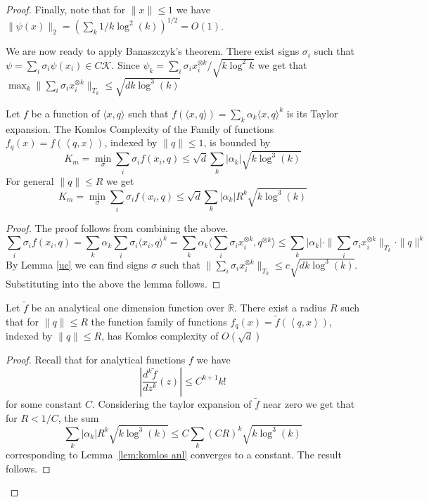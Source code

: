 \documentclass[anon,12pt]{colt2019} %
\newcommand{\ip}[1]{\left \langle #1 \right \rangle}
\newcommand{\R}{\mathbb{R}}
\begin{document}
\begin{proof}
Finally, note that for $\|x\| \le 1$ we have $\|\psi(x)\|_2 = (\sum_k  1/k\log^2(k))^{1/2} = O(1)$.


We are now ready to apply Banaszczyk's theorem. 
There exist signs $\sigma_i$ such that $\psi  = \sum_i \sigma_i \psi(x_i) \in C \mathcal K$.
Since $\psi_k = \sum_i \sigma_i x_i^{\otimes k}/\sqrt{k \log^2{k}}$ we get that $\max_k \|\sum_i \sigma_i  x_i^{\otimes k}\|_{T_k} \le \sqrt{d k \log^{3}(k)}$


\begin{lemma} \label{lem:komlos anl}
Let $f$ be a function of $\langle x,q\rangle$ such that $f(\langle x,q\rangle) = \sum_k \alpha_k \langle x,q\rangle^k$ is its Taylor expansion. The Komlos Complexity of the Family of functions $f_q(x) = f(\ip{q,x})$, indexed by $\|q\| \leq 1$, is bounded by
\[
K_m = \min_\sigma \sum_i \sigma_i f(x_i,q) \le \sqrt{d} \sum_k  |\alpha_k|\sqrt{k\log^3(k)}
\]
For general $\|q\| \leq R$ we get
\[
K_m = \min_\sigma \sum_i \sigma_i f(x_i,q) \le \sqrt{d} \sum_k  |\alpha_k| R^k \sqrt{ k\log^3(k)}
\]
\end{lemma}
\begin{proof}
The proof follows from combining the above.
$$
\sum_i \sigma_i f(x_i,q) = \sum_k \alpha_k \sum_i \sigma_i \langle x_i,q\rangle^k =  \sum_k \alpha_k  \langle  \sum_i \sigma_i x_i^{\otimes k},q^{\otimes k}\rangle \le \sum_k |\alpha_k| \cdot \| \sum_i \sigma_i x_i^{\otimes k}\|_{T_k} \cdot \|q\|^k
$$
By Lemma \ref{uc} we can find signs $\sigma$ such that 
$\| \sum_i \sigma_i x_i^{\otimes k}\|_{T_k} \le c\sqrt{d k \log^3(k)}$. Substituting into the above the lemma follows.
\end{proof}

\begin{theorem}
Let $\tilde{f}$ be an analytical one dimension function over $\R$. There exist a radius $R$ such that for $\|q\| \leq R$ the function family of functions $f_q(x) = \tilde{f}(\ip{q,x})$, indexed by $\|q\| \leq R$, has Komlos complexity of $O(\sqrt{d})$ 
\end{theorem}
\begin{proof}
Recall that for analytical functions $f$ we have 
$$\left| \frac{d^k \tilde{f}}{dz^k}(z) \right|  \leq C^{k+1} k! $$
for some constant $C$. Considering the taylor expansion of $\tilde{f}$ near zero we get that for $R < 1/C$, the sum
$$ \sum_k  |\alpha_k| R^k \sqrt{ k\log^3(k)} \leq C \sum_k  (CR)^k \sqrt{ k\log^3(k)}$$
corresponding to Lemma~\ref{lem:komlos anl} converges to a constant. The result follows.
\end{proof}


\end{proof}
\end{document}
